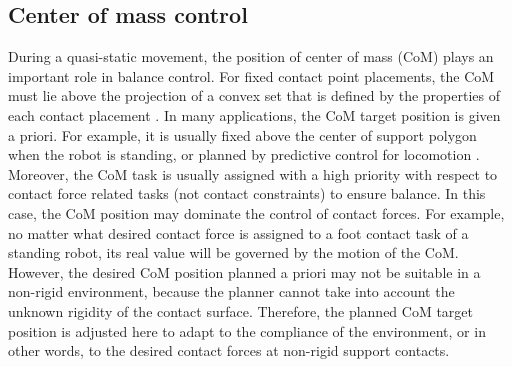 \documentclass[letterpaper, 10 pt, conference]{ieeeconf}  %
\begin{document}
\subsection{Center of mass control}
\label{Subsec:com_control}
During a quasi-static movement, the position of center of mass (CoM) plays an important role in balance control. For fixed contact point placements, the CoM must lie above the projection of a convex set that is defined by the properties of each contact placement \cite{Bretl08}.
In many applications, the CoM target position is given a priori. For example, it is usually fixed above the center of support polygon when the robot is standing, or planned by predictive control for locomotion \cite{Wieber06}. Moreover, the CoM task is usually assigned with a high priority with respect to contact force related tasks (not contact constraints) to ensure balance. In this case, the CoM position may dominate the control of contact forces. For example, no matter what desired contact force is assigned to a foot contact task of a standing robot, its real value will be governed by the motion of the CoM. However, the desired CoM position planned a priori may not be suitable in a non-rigid environment, because the planner cannot take into account the unknown rigidity of the contact surface. Therefore, the planned CoM target position is adjusted here to adapt to the compliance of the environment, or in other words, to the desired contact forces at non-rigid support contacts. 
\end{document}
